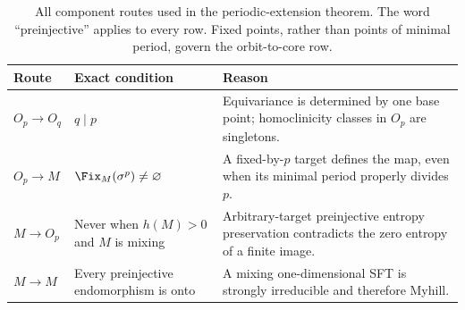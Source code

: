 \begin{table}[H]
\centering
\caption{All component routes used in the periodic-extension theorem.  The
word ``preinjective'' applies to every row.  Fixed points, rather than points
of minimal period, govern the orbit-to-core row.}
\label{tab:routes}
\small
\begin{tabularx}{\textwidth}{@{}>{\raggedright\arraybackslash}p{24mm}
  >{\raggedright\arraybackslash}p{42mm}X@{}}
\toprule
Route & Exact condition & Reason \\
\midrule
$O_p\to O_q$ & $q\mid p$ & Equivariance is determined by one base point;
homoclinicity classes in $O_p$ are singletons. \\
$O_p\to M$ & $\Fix_M(\sigma^p)\ne\varnothing$ & A fixed-by-$p$ target
defines the map, even when its minimal period properly divides $p$. \\
$M\to O_p$ & Never when $h(M)>0$ and $M$ is mixing & Arbitrary-target
preinjective entropy preservation contradicts the zero entropy of a finite
image. \\
$M\to M$ & Every preinjective endomorphism is onto & A mixing
one-dimensional SFT is strongly irreducible and therefore Myhill. \\
\bottomrule
\end{tabularx}
\end{table}
